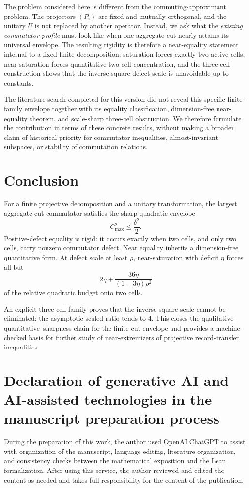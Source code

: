 \documentclass[11pt]{article}
\newcommand{\cmax}{C_{\max}}
\newcommand{\dd}{\delta}
\newcommand{\etaq}{\eta}
\begin{document}
The problem considered here is different from the commuting-approximant
problem.  The projectors $(P_i)$ are fixed and mutually orthogonal, and the
unitary $U$ is not replaced by another operator.  Instead, we ask what the
\emph{existing commutator profile} must look like when one aggregate cut
nearly attains its universal envelope.  The resulting rigidity is therefore
a near-equality statement internal to a fixed finite decomposition:
saturation forces exactly two active cells, near saturation forces
quantitative two-cell concentration, and the three-cell construction shows
that the inverse-square defect scale is unavoidable up to constants.

The literature search completed for this version did not reveal this specific
finite-family envelope together with its equality classification,
dimension-free near-equality theorem, and scale-sharp three-cell obstruction.
We therefore formulate the contribution in terms of these concrete results,
without making a broader claim of historical priority for commutator
inequalities, almost-invariant subspaces, or stability of commutation
relations.

\section{Conclusion}

For a finite projective decomposition and a unitary transformation, the
largest aggregate cut commutator satisfies the sharp quadratic envelope
\[
  \cmax^2\le\frac{\dd^2}{2}.
\]
Positive-defect equality is rigid: it occurs exactly when two cells, and only
two cells, carry nonzero commutator defect.  Near equality inherits a
dimension-free quantitative form.  At defect scale at least $\rho$,
near-saturation with deficit $\etaq$ forces all but
\[
  2\etaq+
  \frac{36\etaq}{(1-3\etaq)\rho^2}
\]
of the relative quadratic budget onto two cells.

An explicit three-cell family proves that the inverse-square scale cannot be
eliminated: the asymptotic scaled ratio tends to $4$.  This closes the
qualitative--quantitative--sharpness chain for the finite cut envelope and
provides a machine-checked basis for further study of near-extremizers of
projective record-transfer inequalities.

\section*{Declaration of generative AI and AI-assisted technologies in the manuscript preparation process}

During the preparation of this work, the author used OpenAI ChatGPT to assist
with organization of the manuscript, language editing, literature
organization, and consistency checks between the mathematical exposition and
the Lean formalization. After using this service, the author reviewed and
edited the content as needed and takes full responsibility for the content of
the publication.



\end{document}
